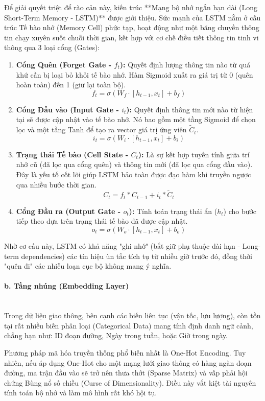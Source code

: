 Để giải quyết triệt để rào cản này, kiến trúc **Mạng bộ nhớ ngắn hạn dài (Long Short-Term Memory - LSTM)** được giới thiệu. Sức mạnh của LSTM nằm ở cấu trúc Tế bào nhớ (Memory Cell) phức tạp, hoạt động như một băng chuyền thông tin chạy xuyên suốt chuỗi thời gian, kết hợp với cơ chế điều tiết thông tin tinh vi thông qua 3 loại cổng (Gates):
\begin{enumerate}
    \item \textbf{Cổng Quên (Forget Gate - $f_t$):} Quyết định lượng thông tin nào từ quá khứ cần bị loại bỏ khỏi tế bào nhớ. Hàm Sigmoid xuất ra giá trị từ 0 (quên hoàn toàn) đến 1 (giữ lại toàn bộ).
    $$f_t = \sigma(W_f \cdot [h_{t-1}, x_t] + b_f)$$
    \item \textbf{Cổng Đầu vào (Input Gate - $i_t$):} Quyết định thông tin mới nào từ hiện tại sẽ được cập nhật vào tế bào nhớ. Nó bao gồm một tầng Sigmoid để chọn lọc và một tầng Tanh để tạo ra vector giá trị ứng viên $\tilde{C}_t$.
    $$i_t = \sigma(W_i \cdot [h_{t-1}, x_t] + b_i)$$
    \item \textbf{Trạng thái Tế bào (Cell State - $C_t$):} Là sự kết hợp tuyến tính giữa trí nhớ cũ (đã lọc qua cổng quên) và thông tin mới (đã lọc qua cổng đầu vào). Đây là yếu tố cốt lõi giúp LSTM bảo toàn được đạo hàm khi truyền ngược qua nhiều bước thời gian.
    $$C_t = f_t * C_{t-1} + i_t * \tilde{C}_t$$
    \item \textbf{Cổng Đầu ra (Output Gate - $o_t$):} Tính toán trạng thái ẩn ($h_t$) cho bước tiếp theo dựa trên trạng thái tế bào đã được cập nhật.
    $$o_t = \sigma(W_o \cdot [h_{t-1}, x_t] + b_o)$$
\end{enumerate}
Nhờ cơ cấu này, LSTM có khả năng "ghi nhớ" (bắt giữ phụ thuộc dài hạn - Long-term dependencies) các tín hiệu ùn tắc tích tụ từ nhiều giờ trước đó, đồng thời "quên đi" các nhiễu loạn cục bộ không mang ý nghĩa.

\paragraph{b. Tầng nhúng (Embedding Layer)} \mbox{} \\
Trong dữ liệu giao thông, bên cạnh các biến liên tục (vận tốc, lưu lượng), còn tồn tại rất nhiều biến phân loại (Categorical Data) mang tính định danh ngữ cảnh, chẳng hạn như: ID đoạn đường, Ngày trong tuần, hoặc Giờ trong ngày.

Phương pháp mã hóa truyền thống phổ biến nhất là One-Hot Encoding. Tuy nhiên, nếu áp dụng One-Hot cho một mạng lưới giao thông có hàng ngàn đoạn đường, ma trận đầu vào sẽ trở nên thưa thớt (Sparse Matrix) và vấp phải hội chứng Bùng nổ số chiều (Curse of Dimensionality). Điều này vắt kiệt tài nguyên tính toán bộ nhớ và làm mô hình rất khó hội tụ.


